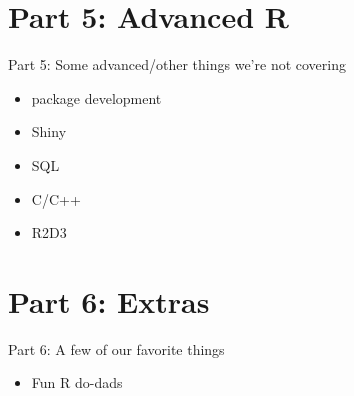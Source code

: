 \documentclass[ignorenonframetext,]{beamer}
\providecommand{\tightlist}{%
  \setlength{\itemsep}{0pt}\setlength{\parskip}{0pt}}
\begin{document}
\hypertarget{part-5-advanced-r}{%
\section{Part 5: Advanced R}\label{part-5-advanced-r}}

\begin{frame}{Part 5: Some advanced/other things we're not covering}
\protect\hypertarget{part-5-some-advancedother-things-were-not-covering}{}

\begin{itemize}
\tightlist
\item
  package development
\item
  Shiny
\item
  SQL
\item
  C/C++
\item
  R2D3
\end{itemize}

\end{frame}

\hypertarget{part-6-extras}{%
\section{Part 6: Extras}\label{part-6-extras}}

\begin{frame}{Part 6: A few of our favorite things}
\protect\hypertarget{part-6-a-few-of-our-favorite-things}{}

\begin{itemize}
\tightlist
\item
  Fun R do-dads
\end{itemize}

\end{frame}
\end{document}
